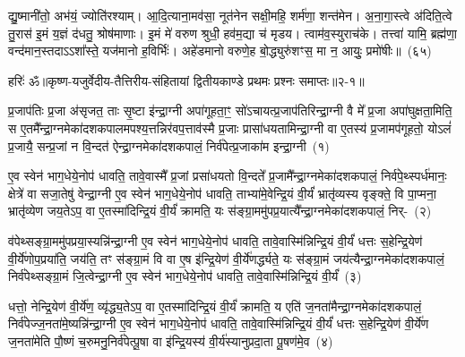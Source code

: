 द्यु॒ष्मानी॑तो॒ अभ॑यं॒ ज्योति॑रश्याम्। आ॒दि॒त्याना॒मव॑सा॒ नूत॑नेन सक्षी॒महि॒ शर्म॑णा॒ शन्त॑मेन। अ॒ना॒गा॒स्त्वे अ॑दिति॒त्वे तु॒रास॑ इ॒मं य॒ज्ञं द॑धतु॒ श्रोष॑माणाः। इ॒मं मे॑ वरुण श्रुधी॒ हव॑म॒द्या च॑ मृडय। त्वाम॑व॒स्युराच॑के। तत्त्वा॑ यामि॒ ब्रह्म॑णा॒ वन्द॑मान॒स्तदा\-ऽऽ\-शा᳚स्ते॒ यज॑मानो ह॒विर्भिः॑। अहे॑डमानो वरुणे॒ह बो॒द्ध्युरु॑शꣳस॒ मा न॒ आयुः॒ प्रमो॑षीः॥~(६५)\ip

{\anuvakamend[{नामा॒ग्निः सꣳ शव॑सो॒ रक्ष॑माणा धी॒र्या॑चि॒देका॒न्नप॑ञ्चा॒शच्च॑}]}%

{हरिः॑ ॐ}{॥कृष्ण-यजुर्वेदीय-तैत्तिरीय-संहितायां द्वितीयकाण्डे प्रथमः प्रश्नः समाप्तः॥२-१॥}

\setcounter{anuvakam}{0}
प्र॒जा\-प॑तिः प्र॒जा अ॑सृजत॒ ताः सृ॒ष्टा इ॑न्द्रा॒ग्नी अपा॑गूहता॒ꣳ॒ सो॑\-ऽचायत्प्र॒जा\-प॑तिरिन्द्रा॒ग्नी वै मे᳚ प्र॒जा अपा॑घुक्षता॒मिति॒ स ए॒तमै᳚न्द्रा॒ग्नमेका॑\-दश\-कपालमपश्य॒त्तन्निर॑वप॒त्ताव॑स्मै प्र॒जाः प्रासा॑धयतामिन्द्रा॒ग्नी वा ए॒तस्य॑ प्र॒जामप॑गूहतो॒ यो\-ऽलं॑ प्र॒जायै॒ सन्प्र॒जां न वि॒न्दत॑ ऐन्द्रा॒ग्नमेका॑\-दश\-कपालं॒ निर्व॑पेत्प्र॒जाका॑म इन्द्रा॒ग्नी~(१)\ip

ए॒व स्वेन॑ भाग॒धेये॒नोप॑ धावति॒ तावे॒वास्मै᳚ प्र॒जां प्रसा॑धयतो वि॒न्दते᳚ प्र॒जामै᳚न्द्रा॒ग्नमेका॑\-दश\-कपालं॒ निर्व॑पे॒थ्स्पर्ध॑मानः॒ क्षेत्रे॑ वा सजा॒तेषु॑ वेन्द्रा॒ग्नी ए॒व स्वेन॑ भाग॒धेये॒नोप॑ धावति॒ ताभ्या॑मे॒वेन्द्रि॒यं वी॒र्यं॑ भ्रातृ॑व्यस्य वृङ्क्ते॒ वि पा॒प्मना॒ भ्रातृ॑व्येण जय॒ते\-ऽप॒ वा ए॒तस्मा॑दिन्द्रि॒यं वी॒र्यं॑ क्रामति॒ यः स॑ङ्ग्रा॒ममु॑पप्र॒यात्यै᳚न्द्रा॒ग्नमेका॑\-दश\-कपालं॒ निर्-~(२)\ip

व॑पेथ्सङ्ग्रा॒ममु॑पप्रया॒स्यन्नि॑न्द्रा॒ग्नी ए॒व स्वेन॑ भाग॒धेये॒नोप॑ धावति॒ तावे॒वास्मि॑न्निन्द्रि॒यं वी॒र्यं॑ धत्तः स॒हेन्द्रि॒येण॑ वी॒र्ये॑णोप॒प्रया॑ति॒ जय॑ति॒ तꣳ स॑ङ्ग्रा॒मं वि वा ए॒ष इ॑न्द्रि॒येण॑ वी॒र्ये॑णर्द्ध्यते॒ यः स॑ङ्ग्रा॒मं जय॑त्यैन्द्रा॒ग्नमेका॑\-दश\-कपालं॒ निर्व॑पेथ्सङ्ग्रा॒मं जि॒त्वेन्द्रा॒ग्नी ए॒व स्वेन॑ भाग॒धेये॒नोप॑ धावति॒ तावे॒वास्मि॑न्निन्द्रि॒यं वी॒र्यं॑~(३)\ip

धत्तो॒ नेन्द्रि॒येण॑ वी॒र्ये॑ण॒ व्यृ॑द्ध्य॒ते\-ऽप॒ वा ए॒तस्मा॑दिन्द्रि॒यं वी॒र्यं॑ क्रामति॒ य एति॑ ज॒नता॑मैन्द्रा॒ग्नमेका॑\-दश\-कपालं॒ निर्व॑पेज्ज॒नता॑\-मे॒ष्यन्नि॑न्द्रा॒ग्नी ए॒व स्वेन॑ भाग॒धेये॒नोप॑ धावति॒ तावे॒वास्मि॑न्निन्द्रि॒यं वी॒र्यं॑ धत्तः स॒हेन्द्रि॒येण॑ वी॒र्ये॑ण ज॒नता॑मेति पौ॒ष्णं च॒रुमनु॒निर्व॑पेत्पू॒षा वा इ॑न्द्रि॒यस्य॑ वी॒र्य॑स्यानुप्रदा॒ता पू॒षण॑मे॒व~(४)\ip

